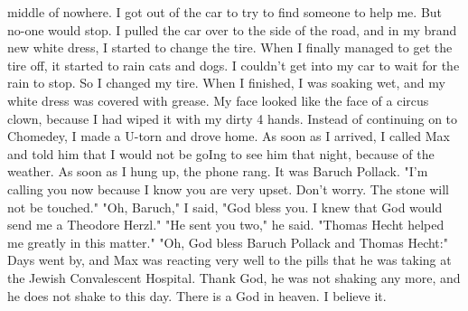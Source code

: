 middle of nowhere. I got out of the car to try to find someone to 
help me. But no-one would stop. I pulled the car over to the side 
of the road, and in my brand new white dress, I started to change the 
tire. When I finally managed to get the tire off, it started to 
rain cats and dogs. I couldn't get into my car to wait for the rain 
to stop. So I changed my tire. When I finished, I was soaking wet, 
and my white dress was covered with grease. My face looked like the 
face of a circus clown, because I had wiped it with my dirty 4 hands. 
Instead of continuing on to Chomedey, I made a U-torn and drove home. 
As soon as I arrived, I called Max and told him that I would not be 
goIng to see him that night, because of the weather. 
As soon as I hung up, the phone rang. It was Baruch Pollack. 
"I'm calling you now because I know you are very upset. Don't 
worry. The stone will not be touched." 
"Oh, Baruch," I said, "God bless you. I knew that God would 
send me a Theodore Herzl." 
"He sent you two," he said. "Thomas Hecht helped me greatly in 
this matter." 
"Oh, God bless Baruch Pollack and Thomas Hecht:" 
Days went by, and Max was reacting very well to the pills that 
he was taking at the Jewish Convalescent Hospital. Thank God, he was 
not shaking any more, and he does not shake to this day. There is a 
God in heaven. I believe it. 


